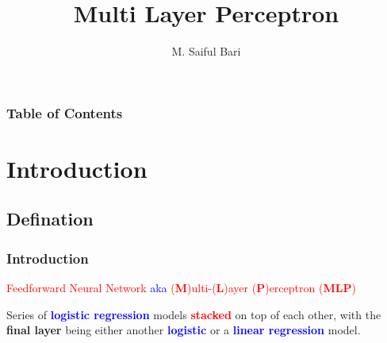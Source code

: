 \documentclass{beamer}
\title[Multi Layer Perceptron]{Multi Layer Perceptron}
\author{M. Saiful Bari}
\begin{document}
\begin{frame}	
  \titlepage
\end{frame}




\begin{frame}

    \frametitle{Table of Contents}
	\begin{multicols}{2}
	    \tableofcontents
	\end{multicols}

\end{frame}



\section{Introduction}
\subsection{Defination}
\begin{frame}
    \frametitle{Introduction}
	\begin{block}{}
		\small \textcolor{red}{Feedforward Neural Network} \textcolor{blue}{aka} \textcolor{red}{(\textbf{M})ulti-(\textbf{L})ayer (\textbf{P})erceptron (\textbf{MLP})}
	\end{block}
	Series of \textbf{\textcolor{blue}{logistic regression}} models \textbf{\textcolor{red}{stacked}} on top of each other, with the \textbf{final layer} being either another \textbf{\textcolor{blue}{logistic}} or a \textbf{\textcolor{blue}{linear regression}} model.

\end{frame}
\end{document}
